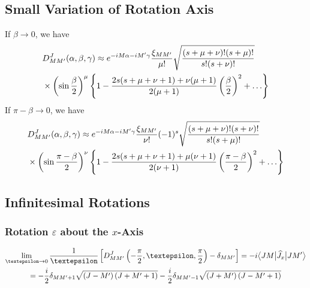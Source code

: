 \subsection{Small Variation of Rotation Axis}\label{sec:4.18.2}
If $\beta \rightarrow 0$, we have
\begin{align}
& D_{M M^{\prime}}^{J}(\alpha, \beta, \gamma) \approx e^{-i M \alpha-i M^{\prime} \gamma} \frac{\xi_{M M^{\prime}}}{\mu!} \sqrt{\frac{(s+\mu+\nu)!(s+\mu)!}{s!(s+\nu)!}}  \label{eq:4:18:3}\\
& \times\left(\sin\frac{\beta}{2}\right)^{\mu}\left\{1-\frac{2 s(s+\mu+\nu+1)+\nu(\mu+1)}{2(\mu+1)}\left(\frac{\beta}{2}\right)^{2}+\ldots\right\} \notag
\end{align}
If $\pi-\beta \rightarrow 0$, we have
\begin{align}
& D_{M M^{\prime}}^{J}(\alpha, \beta, \gamma) \approx e^{-i M \alpha-i M^{\prime} \gamma} \frac{\xi_{M M^{\prime}}}{\nu!}(-1)^{s} \sqrt{\frac{(s+\mu+\nu)!(s+\nu)!}{s!(s+\mu)!}}  \label{eq:4:18:4}\\
& \times\left(\sin\frac{\pi-\beta}{2}\right)^{\nu}\left\{1-\frac{2 s(s+\mu+\nu+1)+\mu(\nu+1)}{2(\nu+1)}\left(\frac{\pi-\beta}{2}\right)^{2}+\ldots\right\} \notag
\end{align}
\subsection{Infinitesimal Rotations}\label{sec:4.18.3}
\subsubsection{ Rotation $\varepsilon$ about the $x$-Axis}
\begin{gather}
\lim _{\varepsilon \rightarrow 0} \frac{1}{\varepsilon}\left[D_{M M^{\prime}}^{J}\left(-\frac{\pi}{2}, \varepsilon, \frac{\pi}{2}\right)-\delta_{M M^{\prime}}\right]=-i\braOket{J M}{\widehat{J}_{x}}{J M^{\prime}}  \notag\\
=-\frac{i}{2} \delta_{M M^{\prime}+1} \sqrt{\left(J-M^{\prime}\right)\left(J+M^{\prime}+1\right)}-\frac{i}{2} \delta_{M M^{\prime}-1} \sqrt{\left(J+M^{\prime}\right)\left(J-M^{\prime}+1\right)} \label{eq:4:18:5}
\end{gather}
